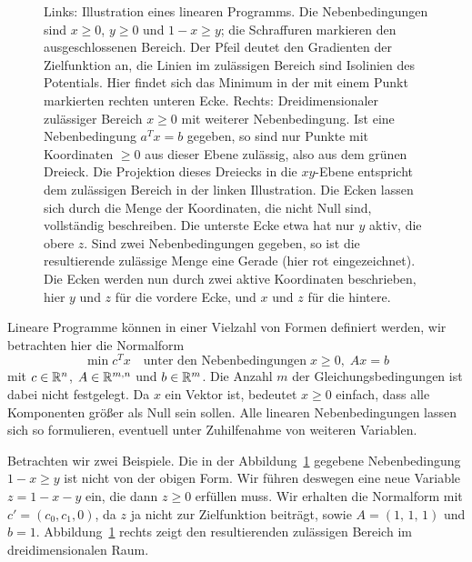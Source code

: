 \begin{figure}
  \caption{Links: Illustration eines linearen Programms. Die
    Nebenbedingungen sind $x\ge 0$, $y\ge 0$ und $1 - x \ge y$; die
    Schraffuren markieren den ausgeschlossenen Bereich. Der Pfeil
    deutet den Gradienten der Zielfunktion an, die Linien im
    zulässigen Bereich sind Isolinien des Potentials. Hier findet sich
    das Minimum in der mit einem Punkt markierten rechten unteren
    Ecke. Rechts: Dreidimensionaler zulässiger Bereich $x\ge 0$ mit
    weiterer Nebenbedingung. Ist eine Nebenbedingung $a^Tx=b$ gegeben,
    so sind nur Punkte mit Koordinaten $\ge 0$ aus dieser Ebene
    zulässig, also aus dem grünen Dreieck. Die Projektion dieses
    Dreiecks in die $xy$-Ebene entspricht dem zulässigen Bereich in
    der linken Illustration. Die Ecken lassen sich durch die Menge der
    Koordinaten, die nicht Null sind, vollständig beschreiben. Die
    unterste Ecke etwa hat nur $y$ aktiv, die obere $z$. Sind zwei
    Nebenbedingungen gegeben, so ist die resultierende zulässige Menge
    eine Gerade (hier rot eingezeichnet). Die Ecken werden nun durch
    zwei aktive Koordinaten beschrieben, hier $y$ und $z$ für die
    vordere Ecke, und $x$ und $z$ für die hintere.}
  \label{fig:simplex}
\end{figure}

Lineare Programme können in einer Vielzahl von Formen definiert
werden, wir betrachten hier die Normalform
\begin{equation}
  \label{eq:simplexprob}
  \min c^Tx \quad\text{unter den Nebenbedingungen}\; x\ge 0,\;Ax=b
\end{equation}
mit $c\in\mathbb{R}^n$, $A\in\mathbb{R}^{m,n}$ und $b\in\mathbb{R}^{m}$. Die Anzahl $m$ der
Gleichungsbedingungen ist dabei nicht festgelegt. Da $x$ ein Vektor
ist, bedeutet $x\ge 0$ einfach, dass alle Komponenten größer als Null
sein sollen. Alle linearen Nebenbedingungen lassen sich so
formulieren, eventuell unter Zuhilfenahme von weiteren Variablen.

Betrachten wir zwei Beispiele. Die in der Abbildung~\ref{fig:simplex}
gegebene Nebenbedingung $1 - x \ge y$ ist nicht von der obigen
Form. Wir führen deswegen eine neue Variable $z=1-x-y$ ein, die dann
$z\ge 0$ erfüllen muss. Wir erhalten die Normalform mit $c'=(c_0, c_1,
0)$, da $z$ ja nicht zur Zielfunktion beiträgt, sowie $A=(1,\,1,\,1)$
und $b=1$. Abbildung~\ref{fig:simplex} rechts zeigt den resultierenden
zulässigen Bereich im dreidimensionalen Raum.

